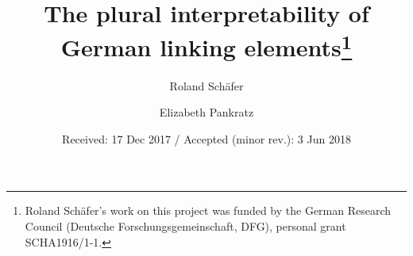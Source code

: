 

\smartqed

\title{The plural interpretability of German linking elements\thanks{Roland Schäfer's work on this project was funded by the German Research Council (Deutsche Forschungsgemeinschaft, DFG), personal grant SCHA1916/1-1.}}
\author{Roland Schäfer \and Elizabeth Pankratz}
\date{Received: 17 Dec 2017 / Accepted (minor rev.): 3 Jun 2018}
